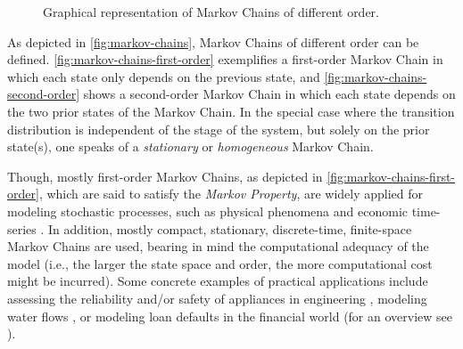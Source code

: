 \begin{figure}[t!]
	\captionsetup[subfigure]{justification=centering}
	\centering
	 \quad
	\caption{Graphical representation of Markov Chains of different order.}
	\label{fig:markov-chains}
\end{figure}

As depicted in \autoref{fig:markov-chains}, Markov Chains of different order can be defined. \autoref{fig:markov-chains-first-order} exemplifies a first-order Markov Chain in which each state only depends on the previous state, and \autoref{fig:markov-chains-second-order} shows a second-order Markov Chain in which each state depends on the two prior states of the Markov Chain.
In the special case where the transition distribution is independent of the stage of the system, but solely on the prior state(s), one speaks of a \textit{stationary} or \textit{homogeneous} Markov Chain.

Though, mostly first-order Markov Chains, as depicted in \autoref{fig:markov-chains-first-order}, which are said to satisfy the \textit{Markov Property}, are widely applied for modeling stochastic processes, such as physical phenomena and economic time-series \cite{bacciu2015probabilistic}.
In addition, mostly compact, stationary, discrete-time, finite-space Markov Chains are used, bearing in mind the computational adequacy of the model (i.e., the larger the state space and order, the more computational cost might be incurred).
Some concrete examples of practical applications include assessing the reliability and/or safety of appliances in engineering \cite{cochran2001generic, cronvall2009combining,el2008optimal}, modeling water flows \cite{parent1991stochastic}, or modeling loan defaults \cite{grimshaw2011markov} in the financial world (for an overview see \cite{pasanisi2012estimating}).

